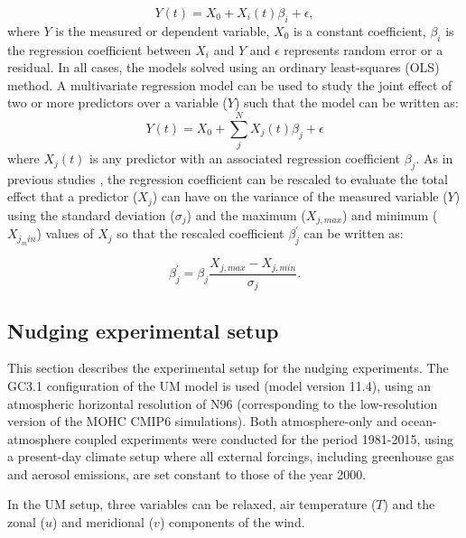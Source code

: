 \begin{equation}
Y(t)=X_0+X_i(t)\beta_i + \epsilon,
\end{equation}
\noindent where $Y$ is the measured or dependent variable, $X_0$ is a constant coefficient, $\beta_i$ is the regression coefficient between $X_i$ and $Y$ and $\epsilon$ represents random error or a residual.  In all cases, the models solved using an ordinary least-squares (OLS) method.
A multivariate regression model can be used to study the joint effect of two or more predictors over a variable ($Y$) such that the model can be written as:
\begin{equation}
Y(t)=X_0+\sum_j^NX_j(t)\beta_j+\epsilon
\end{equation}
\noindent where $X_j(t)$ is any predictor with an associated regression coefficient $\beta_j$. 
As in previous studies \citep{gray2018,misios2019slowdown}, the regression coefficient can be rescaled to evaluate the total effect that a predictor ($X_j$) can have on the variance of the measured variable ($Y$) using the standard deviation ($\sigma_j$) and the maximum ($X_{j,max}$) and minimum ($X_{j_min}$) values of $X_j$ so that the rescaled coefficient $\beta_j^\prime$ can be written as:

\begin{equation}
\beta_j^\prime=\beta_j\frac{X_{j,max}-X_{j,min}}{\sigma_j}.
\end{equation}

\subsection{Nudging experimental setup}

This section describes the experimental setup for the nudging experiments. 
The GC3.1 configuration of the UM model is used (model version 11.4), using an atmospheric horizontal resolution of N96 (corresponding to the low-resolution version of the MOHC CMIP6 simulations). 
Both atmosphere-only and ocean-atmosphere coupled experiments were conducted for the period 1981-2015, using a present-day climate setup where all external forcings, including greenhouse gas and aerosol emissions, are set constant to those of the year 2000. %

 In the UM setup, three variables can be relaxed, air temperature ($T$) and the zonal ($u$) and meridional ($v$) components of the wind. 

